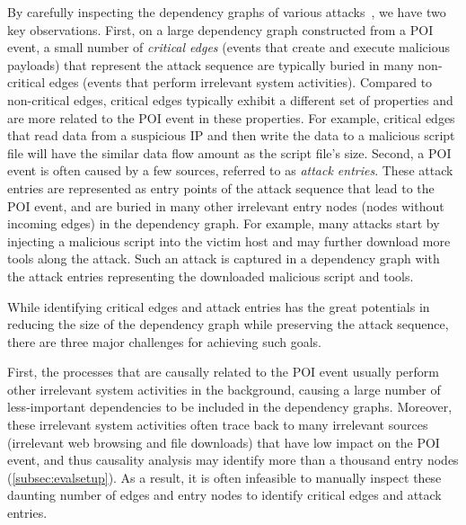 By carefully inspecting the dependency graphs of various attacks~\cite{gao2018aiql,mcitracking,liu2018priotracker,ma2016protracer}, we have two key observations.
%
First, on a large dependency graph constructed from a POI event, a small number of \emph{critical edges} (\eg events that create and execute malicious payloads) that represent the attack sequence are typically buried in many non-critical edges (\eg events that perform irrelevant system activities).
Compared to non-critical edges, critical edges typically exhibit a different set of properties and are more related to the POI event in these properties. 
For example, critical edges that read data from a suspicious IP and then write the data to a malicious script file will have the similar data flow amount as the script file's size. 
Second, a POI event is often caused by a few sources, referred to as \emph{attack entries}.
These attack entries are represented as entry points of the attack sequence that lead to the POI event, and are buried in many other irrelevant entry nodes (\ie nodes without incoming edges) in the dependency graph.
For example, many attacks start by injecting a malicious script into the victim host and may further download more tools along the attack.
Such an attack is captured in a dependency graph with the attack entries representing the downloaded malicious script and tools. 
%

While identifying critical edges and attack entries has the great potentials in reducing the size of the dependency graph while preserving the attack sequence, there are three major challenges for achieving such goals.

First, the processes that are causally related to the POI event usually perform other irrelevant system activities in the background, causing a large number of less-important dependencies to be included in the dependency graphs.
Moreover, these irrelevant system activities often trace back to many irrelevant sources (\eg irrelevant web browsing and file downloads) that have low impact on the POI event, and thus causality analysis may identify more than a thousand entry nodes (\cref{subsec:evalsetup}).
As a result, it is often infeasible to manually inspect these daunting number of edges and entry nodes to identify critical edges and attack entries.

